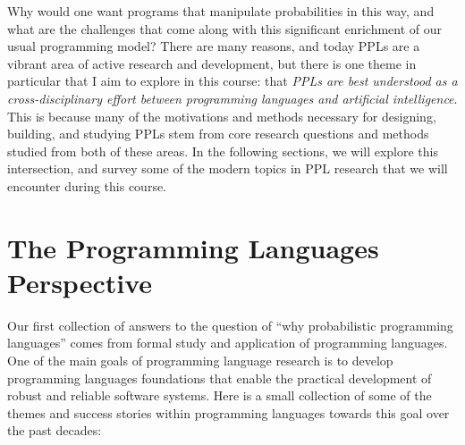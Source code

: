 \documentclass{tufte-handout}
\begin{document}
Why would one want programs that manipulate probabilities in this way,
and what are the challenges that come along with this significant enrichment of
our usual programming model? 
There are many reasons, and today PPLs are a vibrant area of active research and 
development, but there is one theme in particular that I aim to explore in this course:
that \emph{PPLs are best understood as a cross-disciplinary 
effort between programming languages and artificial intelligence}.
This is because 
many of the motivations and methods necessary for designing, building, and studying PPLs stem from core 
research questions and methods studied from both of these areas.
In the following sections, we will explore 
this intersection, and survey some of the modern topics in PPL research that 
we will encounter during this course.

\section{The Programming Languages Perspective}


Our first collection of answers to the question of ``why probabilistic
programming languages'' comes from formal study and application of programming
languages. One of the main goals of programming language research is to develop
programming languages foundations that enable the practical development of
robust and reliable software systems. Here is a small collection of some 
of the themes and success stories within programming languages towards this goal over the past
decades:
\end{document}
